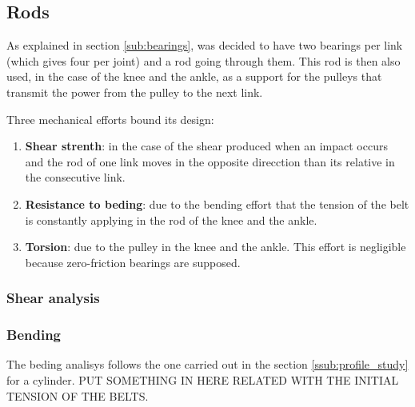 \subsection{Rods} %
\label{sub:rods}
As explained in section \ref{sub:bearings}, was decided to have two bearings per link (which gives four per joint) and a rod going through them.
This rod is then also used, in the case of the knee and the ankle, as a support for the pulleys that transmit the power from the pulley to the next link.

Three mechanical efforts bound its design:
\begin{enumerate}
  \item \textbf{Shear strenth}: in the case of the shear produced when an impact occurs and the rod of one link moves in the opposite direcction than its relative in the consecutive link.
  \item \textbf{Resistance to beding}: due to the bending effort that the tension of the belt is constantly applying in the rod of the  knee and the ankle.
  \item \textbf{Torsion}: due to the pulley in the knee and the ankle. 
  This effort is negligible because zero-friction bearings are supposed.
\end{enumerate}

  \subsubsection{Shear analysis} %
  \label{ssub:shear_analysis}


  \subsubsection{Bending} %
  \label{ssub:bending}
  The beding analisys follows the one carried out in the section \ref{ssub:profile_study} for a cylinder.
  PUT SOMETHING IN HERE RELATED WITH THE INITIAL TENSION OF THE BELTS.


